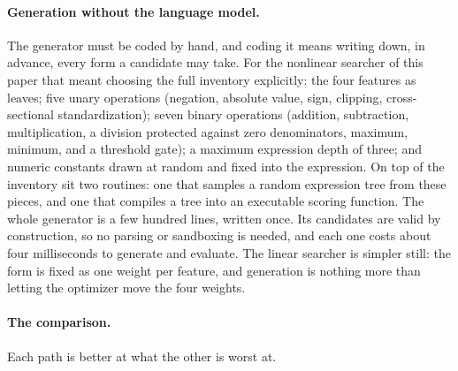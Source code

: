 \documentclass[11pt]{article}
\begin{document}
\paragraph{Generation without the language model.} The generator must be coded by hand, and coding it
means writing down, in advance, every form a candidate may take. For the nonlinear searcher of this
paper that meant choosing the full inventory explicitly: the four features as leaves; five unary
operations (negation, absolute value, sign, clipping, cross-sectional standardization); seven binary
operations (addition, subtraction, multiplication, a division protected against zero denominators,
maximum, minimum, and a threshold gate); a maximum expression depth of three; and numeric constants
drawn at random and fixed into the expression. On top of the inventory sit two routines: one that
samples a random expression tree from these pieces, and one that compiles a tree into an executable
scoring function. The whole generator is a few hundred lines, written once. Its candidates are valid by
construction, so no parsing or sandboxing is needed, and each one costs about four milliseconds to
generate and evaluate. The linear searcher is simpler still: the form is fixed as one weight per
feature, and generation is nothing more than letting the optimizer move the four weights.

\paragraph{The comparison.} Each path is better at what the other is worst at.
\end{document}
